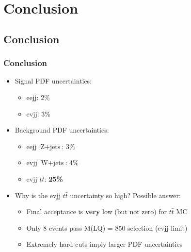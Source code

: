 \documentclass[bigger]{beamer}
\providecommand{\alert}[1]{\textbf{#1}}
\begin{document}
\section{Conclusion}
\label{sec-4}
\subsection{Conclusion}
\label{sec-4-1}
\begin{frame}
\frametitle{Conclusion}
\label{sec-4-1-1}
\begin{itemize}

\item Signal PDF uncertainties:
\label{sec-4-1-1-1}%
\begin{itemize}

\item eejj: 2\%
\label{sec-4-1-1-1-1}%

\item evjj: 3\%
\label{sec-4-1-1-1-2}%
\end{itemize} %

\item Background PDF uncertainties:
\label{sec-4-1-1-2}%
\begin{itemize}

\item eejj $\text{Z}+\text{jets}$: 3\%
\label{sec-4-1-1-2-1}%

\item evjj $\text{W}+\text{jets}$: 4\%
\label{sec-4-1-1-2-2}%

\item evjj $t\bar{t}$: \alert{25\%}
\label{sec-4-1-1-2-3}%
\end{itemize} %

\item Why is the evjj $t\bar{t}$ uncertainty so high?  Possible answer:
\label{sec-4-1-1-3}%
\begin{itemize}

\item Final acceptance is \alert{very} low (but not zero) for $t\bar{t}$ MC
\label{sec-4-1-1-3-1}%

\item Only 8 events pass M(LQ) = 850 selection (evjj limit)
\label{sec-4-1-1-3-2}%

\item Extremely hard cuts imply larger PDF uncertainties
\label{sec-4-1-1-3-3}%
\end{itemize} %
\end{itemize} %
\end{frame}
\end{document}
